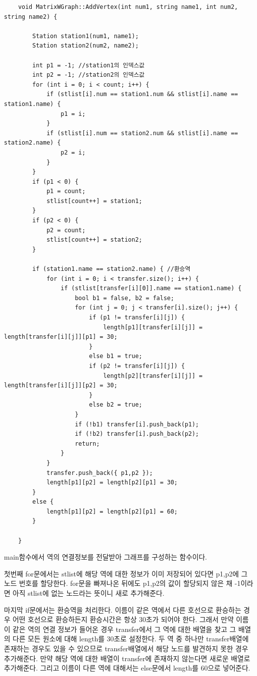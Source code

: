 \documentclass{oblivoir}
\begin{document}
\begin{verbatim}
    void MatrixWGraph::AddVertex(int num1, string name1, int num2, string name2) {

    	Station station1(num1, name1);
    	Station station2(num2, name2);
    
    	int p1 = -1; //station1의 인덱스값
    	int p2 = -1; //station2의 인덱스값
    	for (int i = 0; i < count; i++) {
    		if (stlist[i].num == station1.num && stlist[i].name == station1.name) {
    			p1 = i;
    		}
    		if (stlist[i].num == station2.num && stlist[i].name == station2.name) {
    			p2 = i;
    		}
    	}
    	if (p1 < 0) {
    		p1 = count;
    		stlist[count++] = station1;
    	}
    	if (p2 < 0) {
    		p2 = count;
    		stlist[count++] = station2;
    	}
    
    	if (station1.name == station2.name) { //환승역
    		for (int i = 0; i < transfer.size(); i++) {
    			if (stlist[transfer[i][0]].name == station1.name) {
    				bool b1 = false, b2 = false;
    				for (int j = 0; j < transfer[i].size(); j++) {
    					if (p1 != transfer[i][j]) {
    						length[p1][transfer[i][j]] = length[transfer[i][j]][p1] = 30;
    					}
    					else b1 = true;
    					if (p2 != transfer[i][j]) {
    						length[p2][transfer[i][j]] = length[transfer[i][j]][p2] = 30;
    					}
    					else b2 = true;
    				}
    				if (!b1) transfer[i].push_back(p1);
    				if (!b2) transfer[i].push_back(p2);
    				return;
    			}
    		}
    		transfer.push_back({ p1,p2 });
    		length[p1][p2] = length[p2][p1] = 30;
    	}
    	else {
    		length[p1][p2] = length[p2][p1] = 60;
    	}
    	
    }
\end{verbatim}

main함수에서 역의 연결정보를 전달받아 그래프를 구성하는 함수이다.

첫번째 for문에서는
stlist에 해당 역에 대한 정보가 이미 저장되어 있다면 p1,p2에 그 노드 번호를 할당한다. for문을 빠져나온 뒤에도 p1,p2의 값이 할당되지 않은 채 -1이라면 아직 stlist에 없는 노드라는 뜻이니 새로 추가해준다.

마지막 if문에서는 환승역을 처리한다.
이름이 같은 역에서 다른 호선으로 환승하는 경우 어떤 호선으로 환승하든지 환승시간은 항상 30초가 되어야 한다. 그래서 만약 이름이 같은 역의 연결 정보가 들어온 경우 transfer에서 그 역에 대한 배열을 찾고 그 배열의 다른 모든 원소에 대해 length를 30초로 설정한다. 두 역 중 하나만 transfer배열에 존재하는 경우도 있을 수 있으므로 transfer배열에서 해당 노드를 발견하지 못한 경우 추가해준다.
만약 해당 역에 대한 배열이 transfer에 존재하지 않는다면 새로운 배열로 추가해준다.
그리고 이름이 다른 역에 대해서는 else문에서 length를 60으로 넣어준다.
\end{document}
